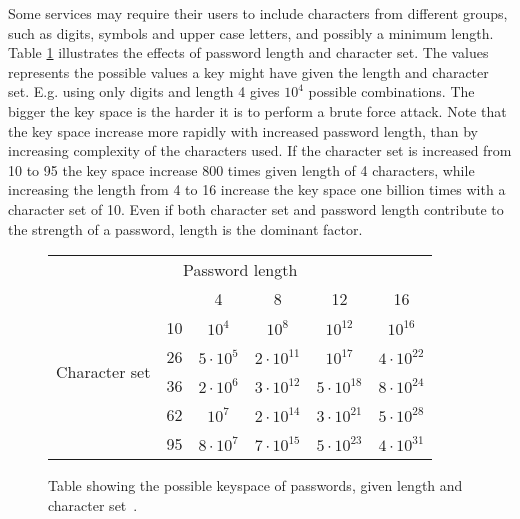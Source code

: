 \par Some services may require their users to include characters from different groups, such as digits, symbols and upper case letters, and possibly a minimum length. Table \ref{pw-strength} illustrates the effects of password length and character set. The values represents the possible values a key might have given the length and character set. E.g. using only digits and length 4 gives $10^4$ possible combinations. The bigger the key space is the harder it is to perform a brute force attack. Note that the key space increase more rapidly with increased password length, than by increasing complexity of the characters used. If the character set is increased from 10 to 95 the key space increase 800 times given length of 4 characters, while increasing the length from 4 to 16 increase the key space one billion times with a character set of 10. Even if both character set and password length contribute to the strength of a password, length is the dominant factor.



\begin{figure}
    \centering
    \begin{tabular}{c|c|c|c|c|c|}
    \multicolumn{6}{c}{Password length}\\\cline{2-6}
    \multirow{6}{*}{\begin{sideways}Character set\end{sideways}}
      &\cellcolor{Gray}&\cellcolor{Gray}4&\cellcolor{Gray}8&\cellcolor{Gray}12&\cellcolor{Gray}16\\\cline{2-6}
    &\cellcolor{Gray}10&$10^4$&$10^8$&$10^{12}$&$10^{16}$\\\cline{2-6}
    &\cellcolor{Gray}26&$5\cdot10^5$&$2\cdot10^{11}$&$10^{17}$&$4\cdot10^{22}$\\\cline{2-6}
    &\cellcolor{Gray}36&$2\cdot 10^6$&$3\cdot10^{12}$&$5\cdot10^{18}$&$8\cdot10^{24}$\\\cline{2-6}
    &\cellcolor{Gray}62&$10^7$&$2\cdot10^{14}$&$3\cdot10^{21}$&$5\cdot10^{28}$\\\cline{2-6}
    &\cellcolor{Gray}95&$8\cdot10^7$&$7\cdot10^{15}$&$5\cdot10^{23}$&$4\cdot10^{31}$\\\cline{2-6}
    \end{tabular}
    \caption{Table showing the possible keyspace of passwords, given length and character set~\cite{nist-guide}.}
    \label{pw-strength}

\end{figure}


